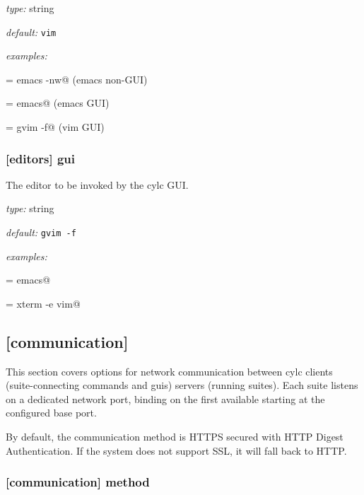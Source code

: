 \begin{myitemize}
\item {\em type:} string
\item {\em default:} \lstinline=vim=
\item {\em examples:}
    \begin{myitemize}
            \item \lstinline@terminal = emacs -nw@ (emacs non-GUI)
            \item \lstinline@terminal = emacs@ (emacs GUI)
            \item \lstinline@terminal = gvim -f@ (vim GUI)
    \end{myitemize}
\end{myitemize}

\subsubsection[gui]{[editors] \textrightarrow gui}

The editor to be invoked by the cylc GUI.

\begin{myitemize}
\item {\em type:} string
\item {\em default:} \lstinline=gvim -f=
\item {\em examples:}
    \begin{myitemize}
            \item \lstinline@gui = emacs@
            \item \lstinline@gui = xterm -e vim@
    \end{myitemize}
\end{myitemize}


\subsection{[communication]}

This section covers options for network communication between cylc
clients (suite-connecting commands and guis) servers (running suites).
Each suite listens on a dedicated network port, binding on the first
available starting at the configured base port.

By default, the communication method is HTTPS secured with HTTP Digest
Authentication. If the system does not support SSL, it will fall back
to HTTP.

\subsubsection[method]{[communication] \textrightarrow method }

